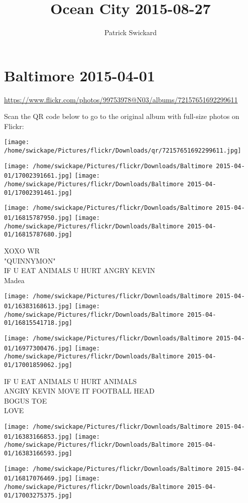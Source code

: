 \documentclass[10pt,letterpaper]{article}
\title{Ocean City 2015-08-27}
\author{Patrick Swickard}
\date{}
\begin{document}
\section*{Baltimore 2015-04-01}

\url{https://www.flickr.com/photos/99753978@N03/albums/72157651692299611}

Scan the QR code below to go to the original album with full-size photos on Flickr:

\texttt{[image: /home/swickape/Pictures/flickr/Downloads/qr/72157651692299611.jpg]}
\pagebreak

\texttt{[image: /home/swickape/Pictures/flickr/Downloads/Baltimore 2015-04-01/17002391661.jpg]}
\texttt{[image: /home/swickape/Pictures/flickr/Downloads/Baltimore 2015-04-01/17002391461.jpg]}

\texttt{[image: /home/swickape/Pictures/flickr/Downloads/Baltimore 2015-04-01/16815787950.jpg]}
\texttt{[image: /home/swickape/Pictures/flickr/Downloads/Baltimore 2015-04-01/16815787680.jpg]}

XOXO WR\\
"QUINNYMON"\\
IF U EAT ANIMALS U HURT ANGRY KEVIN\\
Madea
\pagebreak

\texttt{[image: /home/swickape/Pictures/flickr/Downloads/Baltimore 2015-04-01/16383168613.jpg]}
\texttt{[image: /home/swickape/Pictures/flickr/Downloads/Baltimore 2015-04-01/16815541718.jpg]}

\texttt{[image: /home/swickape/Pictures/flickr/Downloads/Baltimore 2015-04-01/16977300476.jpg]}
\texttt{[image: /home/swickape/Pictures/flickr/Downloads/Baltimore 2015-04-01/17001859062.jpg]}

IF U EAT ANIMALS U HURT ANIMALS\\
ANGRY KEVIN MOVE IT FOOTBALL HEAD\\
BOGUS TOE\\
LOVE
\pagebreak

\texttt{[image: /home/swickape/Pictures/flickr/Downloads/Baltimore 2015-04-01/16383166853.jpg]}
\texttt{[image: /home/swickape/Pictures/flickr/Downloads/Baltimore 2015-04-01/16383166593.jpg]}

\texttt{[image: /home/swickape/Pictures/flickr/Downloads/Baltimore 2015-04-01/16817076469.jpg]}
\texttt{[image: /home/swickape/Pictures/flickr/Downloads/Baltimore 2015-04-01/17003275375.jpg]}
\end{document}

